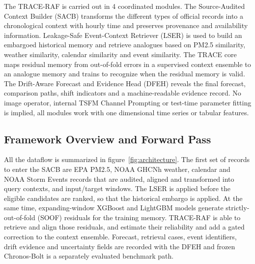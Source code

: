 \documentclass{ieeeaccess}
\begin{document}
The TRACE-RAF is carried out in 4 coordinated modules. The Source-Audited Context Builder (SACB) transforms the different types of official records into a chronological context with hourly time and preserves provenance and availability information. Leakage-Safe Event-Context Retriever (LSER) is used to build an embargoed historical memory and retrieve analogues based on PM2.5 similarity, weather similarity, calendar similarity and event similarity. The TRACE core maps residual memory from out-of-fold errors in a supervised context ensemble to an analogue memory and trains to recognize when the residual memory is valid. The Drift-Aware Forecast and Evidence Head (DFEH) reveals the final forecast, comparison paths, shift indicators and a machine-readable evidence record. No image operator, internal TSFM Channel Prompting or test-time parameter fitting is implied, all modules work with one dimensional time series or tabular features.

\subsection{Framework Overview and Forward Pass}

All the dataflow is summarized in figure~\ref{fig:architecture}. The first set of records to enter the SACB are EPA PM2.5, NOAA GHCNh weather, calendar and NOAA Storm Events records that are audited, aligned and transformed into query contexts, and input/target windows. The LSER is applied before the eligible candidates are ranked, so that the historical embargo is applied. At the same time, expanding-window XGBoost and LightGBM models generate strictly-out-of-fold (SOOF) residuals for the training memory. TRACE-RAF is able to retrieve and align those residuals, and estimate their reliability and add a gated correction to the context ensemble. Forecast, retrieval cases, event identifiers, drift evidence and uncertainty fields are recorded with the DFEH and frozen Chronos-Bolt is a separately evaluated benchmark path.
\end{document}
